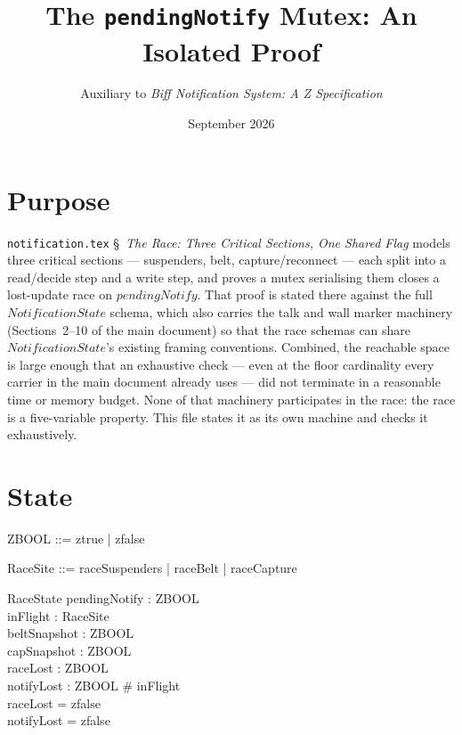 \documentclass[a4paper,10pt,fleqn]{article}
\begin{document}
\title{The \texttt{pendingNotify} Mutex: An Isolated Proof}
\author{Auxiliary to \emph{Biff Notification System: A Z Specification}}
\date{September 2026}

\maketitle

\section{Purpose}

\texttt{notification.tex} \S~\emph{The Race: Three Critical Sections, One Shared Flag} models three critical sections
--- suspenders, belt, capture/reconnect --- each split into a read/decide
step and a write step, and proves a mutex serialising them closes a
lost-update race on $pendingNotify$.  That proof is stated there against
the full $NotificationState$ schema, which also carries the talk and
wall marker machinery (Sections~2--10 of the main document) so that the
race schemas can share $NotificationState$'s existing framing
conventions.  Combined, the reachable space is large enough that an
exhaustive check --- even at the floor cardinality every carrier in the
main document already uses --- did not terminate in a reasonable time or
memory budget.  None of that machinery participates in the race: the
race is a five-variable property.  This file states it as its own
machine and checks it exhaustively.

\section{State}

\begin{zed}
  ZBOOL ::= ztrue | zfalse
\end{zed}

\begin{zed}
  RaceSite ::= raceSuspenders | raceBelt | raceCapture
\end{zed}

\begin{schema}{RaceState}
  pendingNotify : ZBOOL \\
  inFlight : \power RaceSite \\
  beltSnapshot : ZBOOL \\
  capSnapshot : ZBOOL \\
  raceLost : ZBOOL \\
  notifyLost : ZBOOL
  \where
  \# inFlight  \\
  raceLost = zfalse \\
  notifyLost = zfalse
\end{schema}
\end{document}

